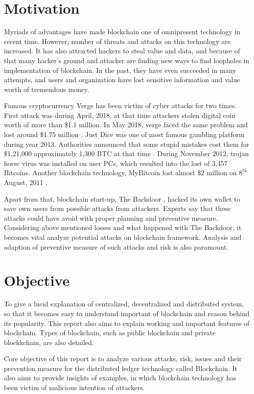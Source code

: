 \documentclass[a4paper,twoside,12pt]{report}
\begin{document}
\begin{spacing}{1.5}
\section{Motivation}
Myriads of advantages have made blockchain one of omnipresent technology in recent time. However, number of threats and attacks on this technology are increased. It has also attracted hackers to steal value and data, and because of that many hacker's ground and attacker are finding new ways to find loopholes in implementation of blockchain. In the past, they have even succeeded in many attempts, and users and organization have lost sensitive information and value worth of tremendous money.
\par
Famous cryptocurrency Verge has been victim of cyber attacks for two times. First attack was during April, 2018, at that time attackers stolen digital coin worth of more than \$1.1 million. In May 2018, verge faced the same problem and lost around \$1.75 million \cite{verge_51_attack}. Just Dice was one of most famous gambling platform during year 2013. Authorities announced that some stupid mistakes cost them for \$1,21,000 approximately 1,300 BTC at that time \cite{all_bitcoin_scam}. During November 2012, trojan horse virus was installed on user PCs, which resulted into the lost of 3,457 Bitcoins. Another blockchain technology, MyBitcoin lost almost \$2 million on $8^{th}$ August, 2011 \cite{mybitcoin_hack}. 
\par
Apart from that, blockchain start-up, The Backdoor , hacked its own wallet to save own users from possible attacks from attackers. Experts say that these attacks could have avoid with proper planning and preventive measure. Considering above mentioned losses and what happened with The Backdoor, it becomes vital analyze potential attacks on blockchain framework. Analysis and adaption of preventive measure of such attacks and risk is also paramount. 
\section{Objective}
To give a lucid explanation of centralized, decentralized and distributed system, so that it becomes easy to understand important of blockchain and reason behind its popularity. This report also aims to explain working and important features of blockchain. Types of blockchain, such as public blockchain and private blockkchain, are also detailed.  
\par
Core objective of this report is to analyze various attacks, risk, issues and their prevention measure for the distributed ledger technology called Blockchain. It also aims to provide insights of examples, in which blockchain technology has been victim of malicious intention of attackers.

\end{spacing}
\end{document}
